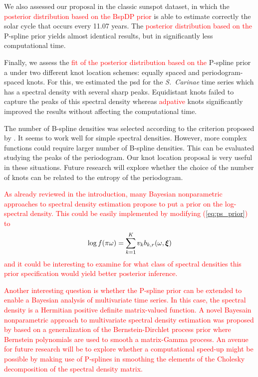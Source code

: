 \documentclass[twocolumn,final]{svjour3}
\newcommand{\bm}[1]{\mbox{\boldmath $#1$}}
\begin{document}

We also assessed our proposal in the classic sunspot dataset, in which the \textcolor{red}{posterior distribution based on the BspDP prior }%
 is able to estimate correctly the solar cycle that occurs every 11.07 years.  The \textcolor{red}{posterior distribution based on the} P-spline prior yields almost identical results, but in  significantly  less computational time.  

Finally, we assess the \textcolor{red}{ fit of the posterior distribution based on the} P-spline prior a under two different knot location schemes: equally spaced and periodogram-spaced knots.  For this, we estimated the psd for the {\it S.\ Carinae} time series which has a spectral density with several sharp peaks.  Equidistant knots failed to capture the peaks of this spectral density whereas  \textcolor{red}{adpative} knots significantly improved  the results without affecting the computational time.

The number of B-spline densities was selected according to the criterion proposed by \cite{Ruppert2002}.  It seems to work well for simple spectral densities.  However, more complex functions could require larger number of B-spline densities.  This can be evaluated studying the peaks of the periodogram.  Our knot location proposal is very useful in these situations.  Future research will explore whether the choice of the number of knots can be related to the entropy of the periodogram.

\textcolor{red}{As already reviewed in the introduction, many Bayesian nonparametric approaches to spectral density estimation propose to put a prior on the log-spectral density. This could be easily implemented by modifying (\ref{eq:ps_prior}) to
 \[ \log f(\pi \omega)=\sum_{k=1}^K v_k b_{k,r}(\omega,{\bm \xi})\]
and it could be interesting to examine for what class of spectral densities this prior specification would yield better posterior inference. }

\textcolor{red}{Another interesting question is whether the P-spline prior can be extended to enable a Bayesian analysis of multivariate time series. In this case, the spectral density is a 
Hermitian positive definite  matrix-valued function. A novel Bayesain nonparametric approach to multivariate spectral density estimation was proposed by
\cite{Meier2020} based on a generalization of the Bernstein-Dirchlet process prior where Bernstein polynomials are used to smooth a matrix-Gamma process.
An avenue for future research will be to explore whether a computational speed-up might be possible by making use of P-splines in smoothing the elements of the
Cholesky decomposition of the spectral density matrix.}
\end{document}
